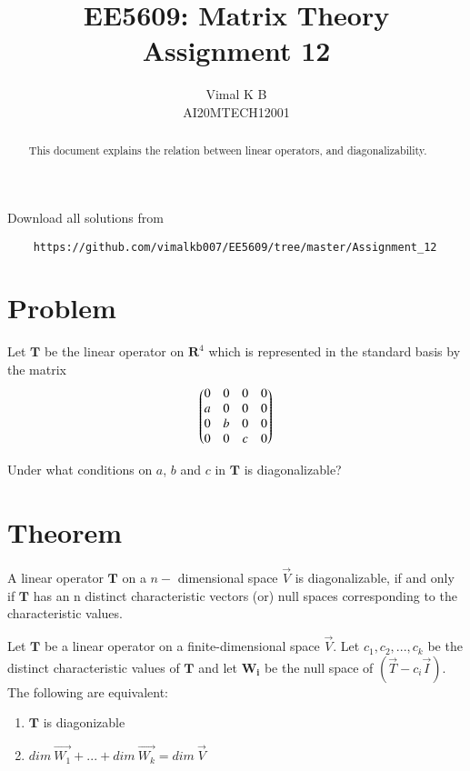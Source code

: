 \documentclass[journal,12pt,twocolumn]{IEEEtran}
\begin{document}
	\def\rightbox#1{\makebox[0in][r]{#1}}
	\def\centbox#1{\makebox[0in]{#1}}
	\def\topbox#1{\raisebox{-\baselineskip}[0in][0in]{#1}}
	\def\midbox#1{\raisebox{-0.5\baselineskip}[0in][0in]{#1}}
	\vspace{3cm}
	\title{EE5609: Matrix Theory\\
		Assignment 12\\}
	\author{Vimal K B\\
		AI20MTECH12001}
	\maketitle
	\newpage
	\bigskip
	\renewcommand{\thefigure}{\theenumi}
	\renewcommand{\thetable}{\theenumi}
	\begin{abstract}
		This document explains the relation between linear operators, and diagonalizability.
	\end{abstract}
	Download all solutions from 
	\begin{lstlisting}
	https://github.com/vimalkb007/EE5609/tree/master/Assignment_12
	\end{lstlisting}
	\section{Problem}
	Let $\mathbf{T}$ be the linear operator on $\mathbf{R}^{4}$ which is represented in the standard basis by the matrix \\
	\begin{align}
	    \begin{pmatrix}0&0&0&0 \\ a&0&0&0 \\ 0&b&0&0 \\ 0&0&c&0\end{pmatrix} \nonumber
	\end{align}
	
	Under what conditions on $a$, $b$ and $c$ in $\mathbf{T}$ is diagonalizable?
	
	
	\section{Theorem}
	
	\begin{theorem}\label{thm1}
	    A linear operator $\mathbf{T}$ on a $n-$ dimensional space $\Vec{V}$ is diagonalizable, if and only if  $\mathbf{T}$ has an n distinct characteristic vectors (or) null spaces corresponding to the characteristic values. 
	\end{theorem}
	
	\begin{theorem}\label{thm2}
	    Let $\mathbf{T}$ be a linear operator on a finite-dimensional space $\Vec{V}$. Let $c_1, c_2,...,c_k$ be the distinct characteristic values of $\mathbf{T}$ and let $\mathbf{W_i}$ be the null space of $\left(\Vec{T}-c_{i}\Vec{I}\right)$. The following are equivalent:
	    \begin{enumerate}
	        \item $\mathbf{T}$ is diagonizable
	        \item $dim\ \Vec{W_1}+...+dim\ \Vec{W_k} = dim\ \Vec{V}$
	    \end{enumerate}
	\end{theorem}
	    
\end{document}
